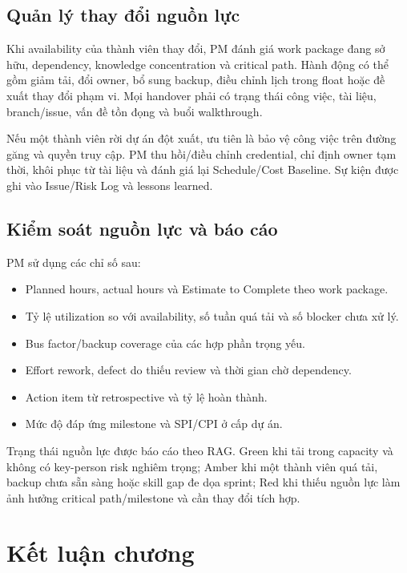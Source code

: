 \subsection{Quản lý thay đổi nguồn lực}

Khi availability của thành viên thay đổi, PM đánh giá work package đang sở hữu, dependency, knowledge concentration và critical path. Hành động có thể gồm giảm tải, đổi owner, bổ sung backup, điều chỉnh lịch trong float hoặc đề xuất thay đổi phạm vi. Mọi handover phải có trạng thái công việc, tài liệu, branch/issue, vấn đề tồn đọng và buổi walkthrough.

Nếu một thành viên rời dự án đột xuất, ưu tiên là bảo vệ công việc trên đường găng và quyền truy cập. PM thu hồi/điều chỉnh credential, chỉ định owner tạm thời, khôi phục từ tài liệu và đánh giá lại Schedule/Cost Baseline. Sự kiện được ghi vào Issue/Risk Log và lessons learned.

\subsection{Kiểm soát nguồn lực và báo cáo}

PM sử dụng các chỉ số sau:

\begin{itemize}
  \item Planned hours, actual hours và Estimate to Complete theo work package.
  \item Tỷ lệ utilization so với availability, số tuần quá tải và số blocker chưa xử lý.
  \item Bus factor/backup coverage của các hợp phần trọng yếu.
  \item Effort rework, defect do thiếu review và thời gian chờ dependency.
  \item Action item từ retrospective và tỷ lệ hoàn thành.
  \item Mức độ đáp ứng milestone và SPI/CPI ở cấp dự án.
\end{itemize}

Trạng thái nguồn lực được báo cáo theo RAG. Green khi tải trong capacity và không có key-person risk nghiêm trọng; Amber khi một thành viên quá tải, backup chưa sẵn sàng hoặc skill gap đe dọa sprint; Red khi thiếu nguồn lực làm ảnh hưởng critical path/milestone và cần thay đổi tích hợp.

\fi
\section{Kết luận chương}

